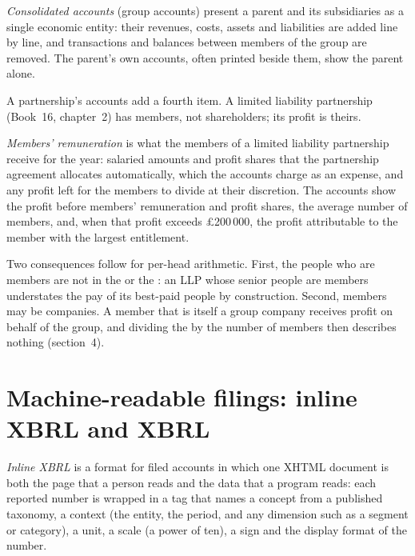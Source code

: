 \begin{definition}\label{def:in:reading-a-trading-firms-accounts:consolidated}
\emph{Consolidated accounts} (group accounts) present a parent and its subsidiaries as a
single economic entity: their revenues, costs, assets and liabilities are added line by line, and transactions and
balances between members of the group are removed. The parent's own accounts, often printed beside them, show the
parent alone.
\end{definition}

A partnership's accounts add a fourth item. A limited liability partnership (Book~16, chapter~2) has members, not
shareholders; its profit is theirs.

\begin{definition}\label{def:in:reading-a-trading-firms-accounts:members}
\emph{Members' remuneration} is what the members of a limited liability partnership
receive for the year: salaried amounts and profit shares that the partnership agreement allocates automatically, which
the accounts charge as an expense, and any profit left for the members to divide at their discretion. The accounts show
the profit before members' remuneration and profit shares, the average number of members, and, when that profit exceeds
\pounds200\,000, the profit attributable to the member with the largest entitlement.
\end{definition}

Two consequences follow for per-head arithmetic. First, the people who are members are not in the  or the
: an LLP whose senior people are members understates the pay of its best-paid people by construction.
Second, members may be companies. A member that is itself a group company receives profit on behalf of the group, and
dividing the  by the number of members then describes nothing (section~4).

\section{Machine-readable filings: inline XBRL and XBRL}

\begin{definition}\label{def:in:reading-a-trading-firms-accounts:ixbrl}
\emph{Inline XBRL} is a format for filed accounts in which one XHTML document is both the page that a
person reads and the data that a program reads: each reported number is wrapped in a tag that names a concept from a
published taxonomy, a context (the entity, the period, and any dimension such as a segment or category), a unit, a
scale (a power of ten), a sign and the display format of the number.
\end{definition}

